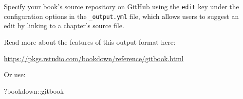 \documentclass[
]{book}
\newenvironment{Shaded}{\begin{snugshade}}{\end{snugshade}}
\newcommand{\NormalTok}[1]{#1}
\newcommand{\SpecialCharTok}[1]{\textcolor[rgb]{0.00,0.00,0.00}{#1}}
\theoremstyle{definition}
\theoremstyle{definition}
\theoremstyle{definition}
\theoremstyle{definition}
\theoremstyle{remark}
\begin{document}
Specify your book's source repository on GitHub using the \texttt{edit} key under the configuration options in the \texttt{\_output.yml} file, which allows users to suggest an edit by linking to a chapter's source file.

Read more about the features of this output format here:

\url{https://pkgs.rstudio.com/bookdown/reference/gitbook.html}

Or use:

\begin{Shaded}
\begin{Highlighting}[]
\NormalTok{?bookdown}\SpecialCharTok{::}\NormalTok{gitbook}
\end{Highlighting}
\end{Shaded}
\end{document}
